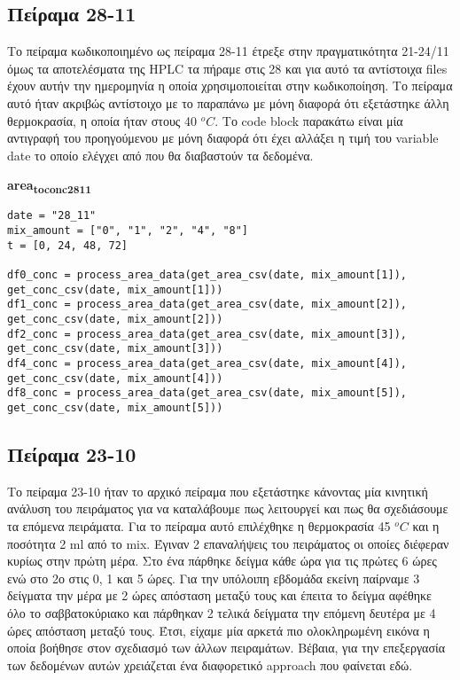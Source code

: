 \documentclass[11pt]{article}
\begin{document}
\subsection{Πείραμα 28-11}
\label{sec:orgf733b91}
Το πείραμα κωδικοποιημένο ως πείραμα 28-11 έτρεξε στην πραγματικότητα 21-24/11 όμως τα αποτελέσματα της HPLC τα πήραμε στις 28 και για αυτό τα αντίστοιχα files έχουν αυτήν την ημερομηνία η οποία χρησιμοποιείται στην κωδικοποίηση. Το πείραμα αυτό ήταν ακριβώς αντίστοιχο με το παραπάνω με μόνη διαφορά ότι εξετάστηκε άλλη θερμοκρασία, η οποία ήταν στους 40 \(^oC\). Το code block παρακάτω είναι μία αντιγραφή του προηγούμενου με μόνη διαφορά ότι έχει αλλάξει η τιμή του variable date το οποίο ελέγχει από που θα διαβαστούν τα δεδομένα.

\textbf{area\textsubscript{to}\textsubscript{conc}\textsubscript{28}\textsubscript{11}}
\begin{verbatim}
date = "28_11"
mix_amount = ["0", "1", "2", "4", "8"]
t = [0, 24, 48, 72]

df0_conc = process_area_data(get_area_csv(date, mix_amount[1]), get_conc_csv(date, mix_amount[1]))
df1_conc = process_area_data(get_area_csv(date, mix_amount[2]), get_conc_csv(date, mix_amount[2]))
df2_conc = process_area_data(get_area_csv(date, mix_amount[3]), get_conc_csv(date, mix_amount[3]))
df4_conc = process_area_data(get_area_csv(date, mix_amount[4]), get_conc_csv(date, mix_amount[4]))
df8_conc = process_area_data(get_area_csv(date, mix_amount[5]), get_conc_csv(date, mix_amount[5]))

\end{verbatim}

\subsection{Πείραμα 23-10}
\label{sec:orgbba45ae}
Το πείραμα 23-10 ήταν το αρχικό πείραμα που εξετάστηκε κάνοντας μία κινητική ανάλυση του πειράματος για να καταλάβουμε πως λειτουργεί και πως θα σχεδιάσουμε τα επόμενα πειράματα. Για το πείραμα αυτό επιλέχθηκε η θερμοκρασία 45 \(^oC\) και η ποσότητα 2 ml από το mix. Έγιναν 2 επαναλήψεις του πειράματος οι οποίες διέφεραν κυρίως στην πρώτη μέρα. Στο ένα πάρθηκε δείγμα κάθε ώρα για τις πρώτες 6 ώρες ενώ στο 2ο στις 0, 1 και 5 ώρες. Για την υπόλοιπη εβδομάδα εκείνη παίρναμε 3 δείγματα την μέρα με 2 ώρες απόσταση μεταξύ τους και έπειτα το δείγμα αφέθηκε όλο το σαββατοκύριακο και πάρθηκαν 2 τελικά δείγματα την επόμενη δευτέρα με 4 ώρες απόσταση μεταξύ τους. Έτσι, είχαμε μία αρκετά πιο ολοκληρωμένη εικόνα η οποία βοήθησε στον σχεδιασμό των άλλων πειραμάτων. Βέβαια, για την επεξεργασία των δεδομένων αυτών χρειάζεται ένα διαφορετικό approach που φαίνεται εδώ.
\end{document}
